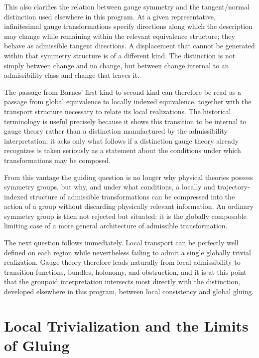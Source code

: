 \documentclass[11pt]{article}
\begin{document}
This also clarifies the relation between gauge symmetry and the tangent/normal distinction used elsewhere in this program. At a given representative, infinitesimal gauge transformations specify directions along which the description may change while remaining within the relevant equivalence structure; they behave as admissible tangent directions. A displacement that cannot be generated within that symmetry structure is of a different kind. The distinction is not simply between change and no change, but between change internal to an admissibility class and change that leaves it.

The passage from Barnes' first kind to second kind can therefore be read as a passage from global equivalence to locally indexed equivalence, together with the transport structure necessary to relate its local realizations. The historical terminology is useful precisely because it shows this transition to be internal to gauge theory rather than a distinction manufactured by the admissibility interpretation; it asks only what follows if a distinction gauge theory already recognizes is taken seriously as a statement about the conditions under which transformations may be composed.

From this vantage the guiding question is no longer why physical theories possess symmetry groups, but why, and under what conditions, a locally and trajectory-indexed structure of admissible transformations can be compressed into the action of a group without discarding physically relevant information. An ordinary symmetry group is then not rejected but situated: it is the globally composable limiting case of a more general architecture of admissible transformation.

The next question follows immediately. Local transport can be perfectly well defined on each region while nevertheless failing to admit a single globally trivial realization. Gauge theory therefore leads naturally from local admissibility to transition functions, bundles, holonomy, and obstruction, and it is at this point that the groupoid interpretation intersects most directly with the distinction, developed elsewhere in this program, between local consistency and global gluing.

\section{Local Trivialization and the Limits of Gluing}
\end{document}
